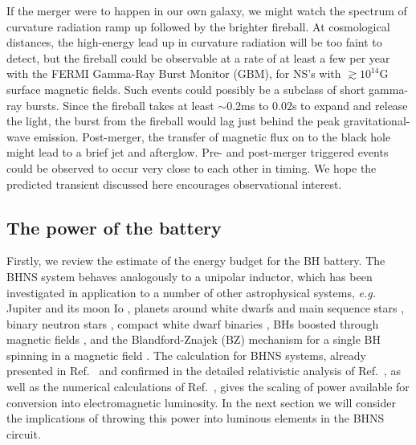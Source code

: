 If the merger were to happen in our own
galaxy, we might watch the spectrum of curvature radiation ramp up
followed by the brighter fireball. At cosmological distances, the
high-energy lead up in curvature radiation will be too faint to
detect, but the fireball could be observable at a rate of at least a
few per year with the FERMI Gamma-Ray Burst Monitor (GBM), for NS's
with $\gtrsim10^{14}$G surface magnetic fields.  Such events 
could possibly be a subclass of short gamma-ray
bursts. Since the fireball takes at least $\sim 0.2$ms to $0.02$s 
to expand and release the light, the burst from the
fireball would lag just behind the peak gravitational-wave emission.
Post-merger, the transfer of magnetic flux on to the black hole might
lead to a brief jet and afterglow. 
Pre- and post-merger triggered events could be observed to occur very close to each other in timing.
We hope the predicted transient discussed here encourages observational interest.



\subsection{The power of the battery}
\label{Orbital inspiral battery}
Firstly, we review the estimate of the energy budget for the BH
battery. The BHNS system behaves analogously to a unipolar inductor, which has been investigated in application 
to a number of other astrophysical systems, \textit{e.g.} Jupiter and 
its moon Io \citep{GLB:1969}, planets around white dwarfs \citep{Li:1998} and main sequence stars \citep{LaineLinI:2012,LaineLinII:2012}, 
binary neutron stars \citep{Vietri:1996,Piro:2012, DLai:2012, Palenzuela:2013}, 
compact white dwarf binaries \citep{Wu:2002, Dall'Osso:2006, Dall'Osso:2007, 
DLai:2012}, BHs boosted through magnetic fields 
\citep{Lyut:2011, Penna:2015}, and the Blandford-Znajek (BZ) mechanism \citep{BZ:1977} for a single BH spinning in a magnetic field  \citep[for recent numerical work on the BZ mechanism see \textit{e.g.}][]{PalenzuelaBZ:2011, Kiuchi:2015}. The calculation for BHNS systems, 
already presented in Ref.\ \cite{McL:2011}
and confirmed in the detailed relativistic analysis of
Ref.\ \cite{DL:2013}, as well as the numerical calculations
of Ref.\ \cite{Paschalidis:2013}, gives the scaling of power available
for conversion into electromagnetic luminosity. In the next section we
will consider the implications of throwing this power into luminous
elements in the BHNS circuit.

